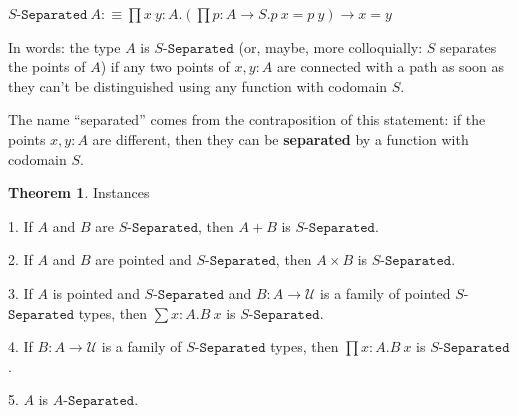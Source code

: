 \documentclass[11pt]{article}
\theoremstyle{definition}
\newtheorem{theorem}{Theorem}[section]
\newcommand{\txt}[1]{\texttt{#1}}
\renewcommand{\(}{\left(}
\renewcommand{\)}{\right)}
\newcommand{\defn}{:\equiv}
\newcommand{\U}{\mathcal{U}}
\newcommand{\apl}[2]{#1\ #2}
\newcommand{\dprod}[2]{\prod #1.#2}
\newcommand{\dsum}[2]{\sum #1.#2}
\newcommand{\prodt}[2]{#1 \times #2}
\begin{document}
\newcommand{\Separated}[1]{#1$-$\txt{Separated}}
$\displaystyle \apl{\Separated{S}}{A} \defn \dprod{x\ y : A}{\(\dprod{p : A \to S}{\apl{p}{x} = \apl{p}{y}}\) \to x = y}$

In words: the type $A$ is $\Separated{S}$ (or, maybe, more colloquially: $S$ separates the points of $A$) if any two points of $x, y : A$ are connected with a path as soon as they can't be distinguished using any function with codomain $S$.

The name ``separated'' comes from the contraposition of this statement: if the points $x, y : A$ are different, then they can be \textbf{separated} by a function with codomain $S$.

\begin{theorem} Instances

1. If $A$ and $B$ are $\Separated{S}$, then $A + B$ is $\Separated{S}$.

2. If $A$ and $B$ are pointed and $\Separated{S}$, then $\prodt{A}{B}$ is $\Separated{S}$.

3. If $A$ is pointed and $\Separated{S}$ and $B : A \to \U$ is a family of pointed $\Separated{S}$ types, then $\dsum{x : A}{\apl{B}{x}}$ is $\Separated{S}$.

4. If $B : A \to \U$ is a family of $\Separated{S}$ types, then $\dprod{x : A}{\apl{B}{x}}$ is $\Separated{S}$.

5. $A$ is $\Separated{A}$.

\end{theorem}
\end{document}
